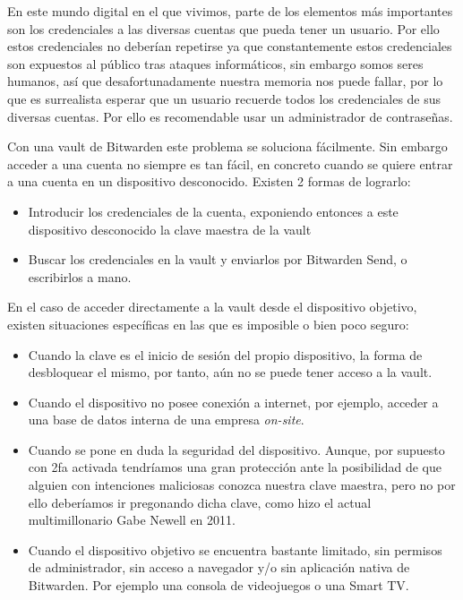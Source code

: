 En este mundo digital en el que vivimos, parte de los elementos más importantes son los credenciales a las diversas \glspl{cuenta} que pueda tener un usuario. Por ello estos credenciales no deberían repetirse ya que constantemente estos credenciales son expuestos al público tras ataques informáticos\cite{pwnedwebs}, sin embargo somos seres humanos, así que desafortunadamente nuestra memoria nos puede fallar, por lo que es surrealista esperar que un usuario recuerde todos los credenciales de sus diversas \glspl{cuenta}. Por ello es recomendable usar un administrador de contraseñas.

Con una \gls{vault} de Bitwarden este problema se soluciona fácilmente. Sin embargo acceder a una \gls{cuenta} no siempre es tan fácil, en concreto cuando se quiere entrar a una \gls{cuenta} en un dispositivo desconocido. Existen 2 formas de lograrlo:
\begin{itemize}
    \item Introducir los credenciales de la \gls{cuenta}, exponiendo entonces a este dispositivo desconocido la clave maestra de la \gls{vault}
    \item Buscar los credenciales en la \gls{vault} y enviarlos por Bitwarden Send, o escribirlos a mano.
\end{itemize}

En el caso de acceder directamente a la \gls{vault} desde el dispositivo objetivo, existen situaciones específicas en las que es imposible o bien poco seguro:
\begin{itemize}
    \item Cuando la clave es el inicio de sesión del propio dispositivo, la forma de desbloquear el mismo, por tanto, aún no se puede tener acceso a la \gls{vault}.
    \item Cuando el dispositivo no posee conexión a internet, por ejemplo, acceder a una base de datos interna de una empresa \textit{on-site}.
    \item Cuando se pone en duda la seguridad del dispositivo. Aunque, por supuesto con \gls{2fa} activada tendríamos una gran protección ante la posibilidad de que alguien con intenciones maliciosas conozca nuestra clave maestra, pero no por ello deberíamos ir pregonando dicha clave, como hizo el actual multimillonario Gabe Newell en 2011. \cite{gabepass}
    \item Cuando el dispositivo objetivo se encuentra bastante limitado, sin permisos de administrador, sin acceso a navegador y/o sin aplicación nativa de Bitwarden. Por ejemplo una consola de videojuegos o una Smart TV.
\end{itemize}

